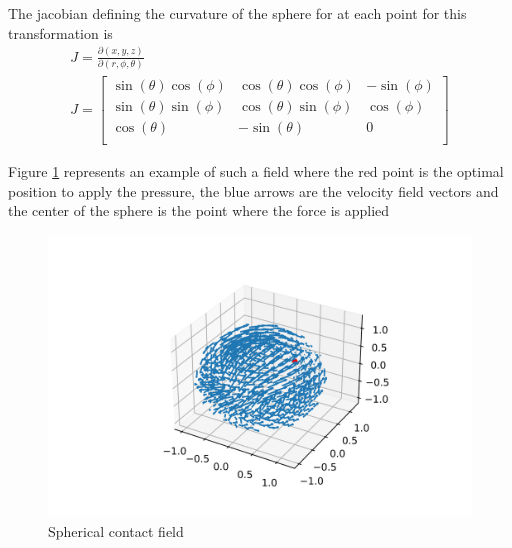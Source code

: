 The jacobian defining the curvature of the sphere for at each point for this transformation is 
\begin{align}
    J = \frac{\partial{(x,y,z)}}{\partial{(r,\phi,\theta)}} \nonumber\\
    J = \begin{bmatrix}
        \sin(\theta)\cos(\phi) & \cos(\theta)\cos(\phi) & -\sin(\phi)\\
        \sin(\theta)\sin(\phi) & \cos(\theta)\sin(\phi) & \cos(\phi)\\
        \cos(\theta) & -\sin(\theta) & 0\\
        \end{bmatrix}
        \label{jacobian}
\end{align}

Figure \ref{fig:spherical} represents an example of such a field where the red point is the optimal position to apply the pressure, the blue arrows are the velocity field vectors and the center of the sphere is the point where the force is applied

\begin{figure}[h!]
    \centering
    \includegraphics[width=\linewidth]{Images/sphericalfield.png}
    \caption{Spherical contact field}
    \label{fig:spherical}
\end{figure}
